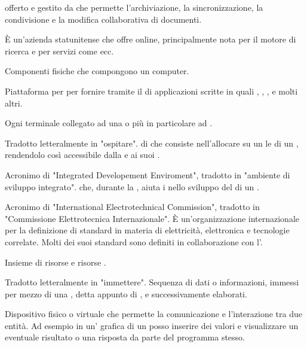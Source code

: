 { offerto e gestito da  che permette l'archiviazione, la sincronizzazione, la condivisione e la modifica collaborativa di documenti.}

{\`{E} un'azienda statunitense che offre  online, principalmente nota per il motore di ricerca  e per servizi come  ecc.}



{Componenti fisiche che compongono un computer.}


{Piattaforma  per per fornire  tramite il  di applicazioni scritte in  quali , , , e molti altri.}


{Ogni terminale collegato ad una  o più in particolare ad .}


{Tradotto letteralmente in "ospitare".  di  che consiste nell'allocare su un  le  di un , rendendolo così accessibile dalla   e ai suoi .}



{Acronimo di "Integrated Developement Enviroment", tradotto in "ambiente di sviluppo integrato".  che, durante la , aiuta i  nello sviluppo del  di un .}


{Acronimo di "International Electrotechnical Commission", tradotto in "Commissione Elettrotecnica Internazionale". \`{E} un'organizzazione internazionale per la definizione di standard in materia di elettricità, elettronica e tecnologie correlate. Molti dei suoi standard sono definiti in collaborazione con l'.}

{Insieme di risorse  e risorse .}


{Tradotto letteralmente in "immettere". Sequenza di dati o informazioni, immessi per mezzo di una , detta appunto di , e successivamente elaborati.}





{Dispositivo fisico o virtuale che permette la comunicazione e l'interazione tra due entità. Ad esempio in un' grafica di un  posso inserire dei valori  e visualizzare un eventuale risultato o una risposta da parte del programma stesso.}



